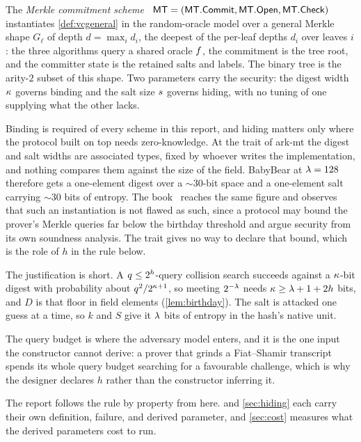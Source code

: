 \begin{definition}
The \emph{Merkle commitment scheme}~\cite{Merkle88}
$\mathsf{MT}=(\mathsf{MT}.\mathsf{Commit},\allowbreak\mathsf{MT}.\mathsf{Open},\allowbreak\mathsf{MT}.\mathsf{Check})$
instantiates \cref{def:vcgeneral} in the random-oracle model over a general
Merkle shape $G_\ell$ of depth $d=\max_i d_i$, the deepest of the per-leaf depths
$d_i$ over leaves $i$: the three algorithms query a
shared oracle $f$, the commitment is the tree root, and the committer
state is the retained salts and labels.  The binary tree is the arity-$2$ subset
of this shape.  Two parameters carry the security: the digest
width $\kappa$ governs binding and the salt size $s$ governs
hiding, with no tuning of one supplying what the other lacks.
\end{definition}

Binding is required of every scheme in this report, and hiding matters only where the
protocol built on top needs zero-knowledge. At the  trait of
\textsf{ark-mt} the digest and salt widths are associated
types, fixed by whoever writes the implementation, and nothing compares them against the
size of the field.  BabyBear at $\lambda=128$ therefore gets a one-element digest over a
${\sim}30$-bit space and a one-element salt carrying ${\sim}30$ bits of entropy.  The
book~\cite{CY26} reaches the same figure and observes that such an instantiation is not
flawed as such, since a protocol may bound the prover's Merkle queries far below the
birthday threshold and argue security from its own soundness analysis.  The trait gives
no way to declare that bound, which is the role of $h$ in the rule below.



The justification is short.  A $q\le2^{h}$-query collision search succeeds
against a $\kappa$-bit digest with probability about
$q^2/2^{\kappa+1}$, so meeting $2^{-\lambda}$ needs
$\kappa\ge\lambda+1+2h$ bits, and $D$ is that floor in field elements
(\cref{lem:birthday}).  The salt is attacked one guess at a time, so $k$ and $S$ give it
$\lambda$ bits of entropy in the hash's native unit.

The query budget is where the adversary model enters, and it is the one input the
constructor cannot derive: a prover that grinds a Fiat--Shamir transcript spends its whole
query budget searching for a favourable challenge, which is why the designer declares $h$
rather than the constructor inferring it.

The report follows the rule by property from here.   and
\cref{sec:hiding} each carry their own definition, failure, and derived parameter, and
\cref{sec:cost} measures what the derived parameters cost to run.

